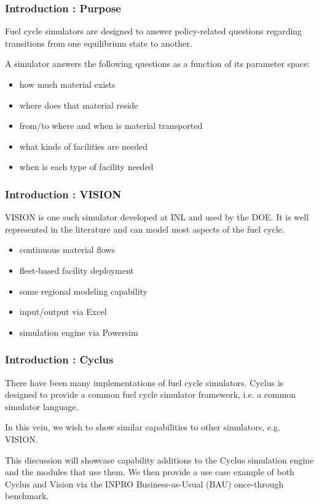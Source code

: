 
\begin{frame}[ctb!]
  \frametitle{Introduction : Purpose}
  Fuel cycle simulators are designed to answer policy-related questions
  regarding transitions from one equilibrium state to another.

  \vspace{0.2cm}

  \pause
  A simulator answers the following questions as a function of its 
  parameter space:
  \begin{itemize}
    \item how much material exists
    \item where does that material reside
    \item from/to where and when is material transported
    \item what kinds of facilities are needed
    \item when is each type of facility needed
  \end{itemize}
\end{frame}

\begin{frame}[ctb!]
  \frametitle{Introduction : VISION}
  VISION is one such simulator developed at INL and used by the DOE. 
  It is well represented in the literature and can model most aspects 
  of the fuel cycle. \cite{yacout_vision_2006}
  \begin{itemize}
    \item continuous material flows
    \item fleet-based facility deployment
    \item some regional modeling capability
    \item input/output via Excel
    \item simulation engine via Powersim
  \end{itemize}
\end{frame}

\begin{frame}[ctb!]
  \frametitle{Introduction : Cyclus}
  There have been many implementations of fuel cycle simulators. 
  Cyclus is designed to provide a common fuel cycle simulator 
  framework, i.e. a common simulator language.

  \vspace{0.2cm}

  In this vein, we wish to show similar capabilities to other 
  simulators, e.g. VISION.

  \vspace{0.2cm}

  \pause
  This discussion will showcase capability additions to the Cyclus
  simulation engine and the modules that use them. We then provide a
  use case example of both Cyclus and Vision via the INPRO 
  Business-as-Usual (BAU) once-through benchmark.
\end{frame}

